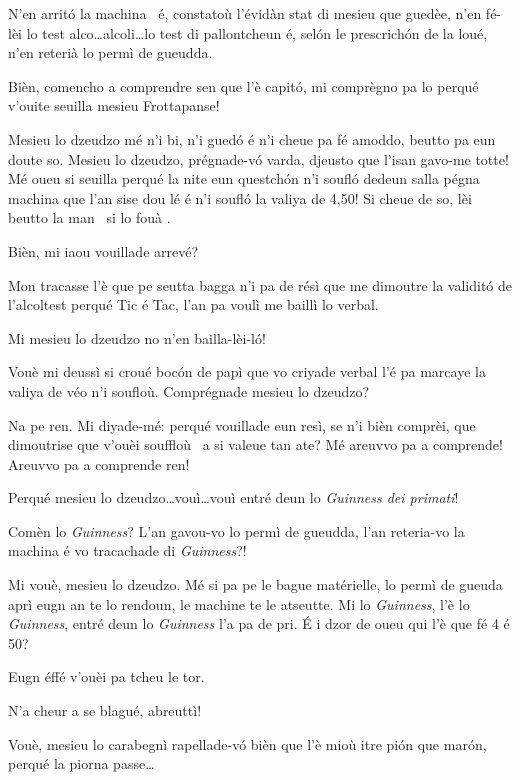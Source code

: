 \begin{drama}
\Ticspeaks N’en arritó la machina \machina\ é, constatoù l’évidàn stat di mesieu que guedèe, n’en fé-lèi lo test alco\ldots alcoli\ldots lo test di pallon\-tcheun é, selón le prescrichón de la loué, n’en reterià lo permì de gueudda.

\DzeudzoSenliquerspeaks Bièn, comencho a comprendre sen que l'è capitó, mi comprègno pa lo perqué v'ouite seuilla mesieu Frottapanse!

\Cienspeaks Mesieu lo dzeudzo mé n’i bi, n’i guedó é n’i cheue pa fé amoddo, beutto pa eun doute so. Mesieu lo dzeudzo, prégnade-v\'o varda, djeusto que l'isan gavo-me totte! Mé oueu si seuilla perqué la nite eun questchón n’i soufló dedeun salla pégna machina que l’an sise dou lé é n’i soufló la valiya de 4,50! Si cheue de so, lèi beutto la man \man\ si lo fouà \foua.

\DzeudzoSenliquerspeaks Bièn, mi iaou vouillade arrevé?

\Cienspeaks Mon tracasse l’è que pe seutta bagga n’i pa de résì que me dimoutre la validitó de l'alcoltest perqué Tic é Tac, l’an pa voulì me baillì lo verbal.

\Ticspeaks Mi mesieu lo dzeudzo no n’en bailla-lèi-l\'o!

\Cienspeaks Vouè mi deussì si croué bocón de papì que vo cri\-ya\-de verbal l'é pa marcaye la valiya de véo n’i soufloù. Comprégnade mesieu lo dzeudzo?

\DzeudzoSenliquerspeaks Na pe ren. Mi diyade-mé: perqué vouillade eun resì, se n’i bièn comprèi, que dimoutrise que v'ouèi souffloù \soffiare\ a si valeue tan ate? Mé areuvvo pa a comprende! Areuvvo pa a comprende ren!

\Cienspeaks Perqué mesieu lo dzeudzo\ldots vouì\ldots vouì entré deun lo  \textit{Guinness dei primati}!

\DzeudzoSenliquerspeaks Comèn lo \textit{Guinness}?  L'an gavou-vo lo permì de gueud\-da, l'an reteria-vo la machina é vo tracachade di \textit{Guinness}?!

\Cienspeaks Mi vouè, mesieu lo dzeudzo. Mé si pa pe le bague matérielle, lo permì de gueuda aprì eugn an te lo rendoun, le machine te le atseutte. Mi lo \textit{Guinness}, l'è lo \textit{Guinness}, entré deun lo \textit{Guinness} l'a pa de pri. É i dzor de oueu qui l'è que fé 4 é 50?

\DzeudzoSenliquerspeaks Eugn éffé v'ouèi pa tcheu le tor.

\Ticspeaks N'a cheur a se blagué, abreuttì!

\Cienspeaks Vouè, mesieu lo carabegnì rapellade-v\'o bièn que l'è mioù itre pi\'on que marón, perqué la piorna passe\ldots


\end{drama}
